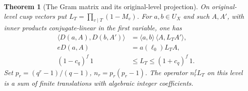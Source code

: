 \documentclass[a4paper,11pt]{article}
\newtheorem{theorem}[proposition]{Theorem}
\theoremstyle{definition}
\theoremstyle{remark}
\numberwithin{equation}{section}
\begin{document}
\begin{theorem}[The Gram matrix and its original-level projection]
\label{thm:hec199}
On original-level cusp vectors put \(L_T=\prod_{v\mid T}(1-M_v)\).
For \(a,b\in U_X\) and such \(A,A'\), with inner products
conjugate-linear in the first variable, one has
\begin{align}
 \langle D(a,A),D(b,A')\rangle
     &=\langle a,b\rangle\,\langle A,L_T A'\rangle ,
                                                 \label{eq:gram199}\\
 eD(a,A)&=a(\ell_0)L_T A,                       \label{eq:compress199}\\
 (1-c_q)^f\,1 &\le L_T\le (1+c_q)^f\,1 .       \label{eq:lower199}
\end{align}
Set \(p_r=(q^r-1)/(q-1)\), \(n_r=p_r(p_r-1)\).
The operator \(n_r^f L_T\) on this level is a sum of
finite translations with algebraic integer coefficients.
\end{theorem}
\end{document}
